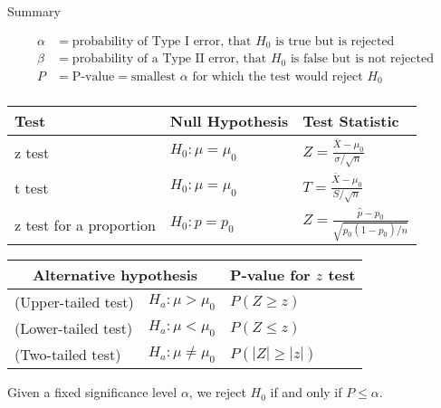 \documentclass[handout]{beamer}
\begin{document}
\begin{frame}{Summary}

\vspace{-.6cm}
\begin{align*}
\alpha &= \text{probability of Type I error, that $H_0$ is true but is rejected}\\
\beta &= \text{probability of a Type II error, that $H_0$ is  false but is not rejected}\\
P &= \text{P-value} = \text{smallest $\alpha$ for which the test would reject $H_0$} \\ 
\end{align*}

\vspace{-.8cm}
\begin{center}
\renewcommand*{\arraystretch}{1.4}
\begin{tabular}{|p{.9in}|l|l|} \hline
Test & Null Hypothesis & Test Statistic  \\ \hline
z test & $H_0: \mu=\mu_0$ &$Z=\frac{\overline X-\mu_0}{\sigma/\sqrt{n}}$  \\ \hline
t test & $H_0: \mu=\mu_0$ & $T=\frac{\overline X-\mu_0}{S /\sqrt{n}}$  \\ \hline
z test for a proportion& $H_0: p=p_0$ & $Z=\frac{\hat p-p_0}{\sqrt{p_0(1-p_0)/n}}$  \\ \hline
\end{tabular}

\begin{center}
\renewcommand*{\arraystretch}{1.1}
\begin{tabular}{ll|l}
\multicolumn{2}{c}{Alternative hypothesis} & P-value for $z$ test \\ \hline
(Upper-tailed test) & $H_a: \mu>\mu_0$ & $P(Z\geq z)$ \\
(Lower-tailed test) & $H_a: \mu<\mu_0$ & $P(Z\leq z)$ \\
(Two-tailed test) & $H_a: \mu\neq\mu_0$ & $P(|Z|\geq |z|)$\\
\end{tabular}
\end{center}
\end{center}

Given a fixed significance level $\alpha$, we reject $H_0$ if  and only if $P\leq \alpha$.

\end{frame}


%
%
%
%

%
%
%
\end{document}
